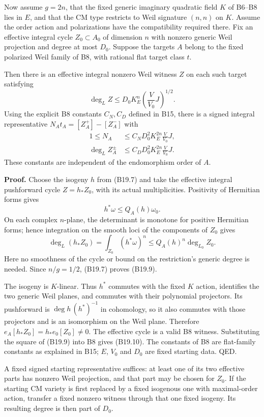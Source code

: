 Now assume \(g=2n\), that the fixed generic imaginary quadratic field \(K\) of B6--B8 lies in \(E\), and that the CM type restricts to Weil signature \((n,n)\) on \(K\). Assume the order action and polarizations have the compatibility required there. Fix an effective integral cycle \(Z_0\subset A_0\) of dimension \(n\) with nonzero generic Weil projection and degree at most \(D_0\). Suppose the targets \(A\) belong to the fixed polarized Weil family of B8, with rational flat target class \(t\).

Then there is an effective integral nonzero Weil witness \(Z\) on each such target satisfying \[
 \deg_L Z
 \le D_0 K_E^n\left(\frac{V}{V_0}J\right)^{1/2}.
\tag{B19.9}
\] Using the explicit B8 constants \(C_N,C_D\) defined in B15, there is a signed integral representative \(N_A t_A=[Z_A^+]-[Z_A^-]\) with \[
 \begin{aligned}
 1\le N_A&\le C_N D_0^2 K_E^{2n}\frac{V}{V_0}J,\\
 \deg_L Z_A^\pm&\le C_D D_0^2 K_E^{2n}\frac{V}{V_0}J.
 \end{aligned}
\tag{B19.10}
\] These constants are independent of the endomorphism order of \(A\).

\textbf{Proof.} Choose the isogeny \(h\) from (B19.7) and take the effective integral pushforward cycle \(Z=h_*Z_0\), with its actual multiplicities. Positivity of Hermitian forms gives \[
 h^*\omega\le Q_A(h)\omega_0.
\] On each complex \(n\)-plane, the determinant is monotone for positive Hermitian forms; hence integration on the smooth loci of the components of \(Z_0\) gives \[
 \deg_L(h_*Z_0)
 =\int_{Z_0}(h^*\omega)^n
 \le Q_A(h)^n\deg_{L_0}Z_0.
\tag{B19.11}
\] Here no smoothness of the cycle or bound on the restriction's generic degree is needed. Since \(n/g=1/2\), (B19.7) proves (B19.9).

The isogeny is \(K\)-linear. Thus \(h^*\) commutes with the fixed \(K\) action, identifies the two generic Weil planes, and commutes with their polynomial projectors. Its pushforward is \(\deg h\,(h^*)^{-1}\) in cohomology, so it also commutes with those projectors and is an isomorphism on the Weil plane. Therefore \(e_A[h_*Z_0]=h_*e_0[Z_0]\ne0\). The effective cycle is a valid B8 witness. Substituting the square of (B19.9) into B8 gives (B19.10). The constants of B8 are flat-family constants as explained in B15; \(E\), \(V_0\) and \(D_0\) are fixed starting data. QED.

A fixed signed starting representative suffices: at least one of its two effective parts has nonzero Weil projection, and that part may be chosen for \(Z_0\). If the starting CM variety is first replaced by a fixed isogenous one with maximal-order action, transfer a fixed nonzero witness through that one fixed isogeny. Its resulting degree is then part of \(D_0\).

